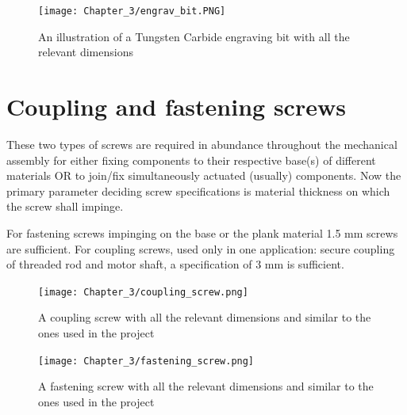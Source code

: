 \begin{figure}[h]
 \centering
 \texttt{[image: Chapter\_3/engrav\_bit.PNG]}
 \caption{An illustration of a Tungsten Carbide engraving bit with all the relevant dimensions}
 \label{fig:ebit}
\end{figure}

\section{Coupling and fastening screws} \label{screws}
These two types of screws are required in abundance throughout the mechanical assembly for either fixing components to their respective base(s) of different materials OR to join/fix simultaneously actuated (usually) components. Now the primary parameter deciding screw specifications is material thickness on which the screw shall impinge. \par

For fastening screws impinging on the base or the plank material 1.5 mm screws are sufficient. For coupling screws, used only in one application: secure coupling of threaded rod and motor shaft, a specification of 3 mm is sufficient.

\begin{figure}[h]
 \centering
 \texttt{[image: Chapter\_3/coupling\_screw.png]}
 \caption{A coupling screw with all the relevant dimensions and similar to the ones used in the project}
 \label{fig:cscrew}
\end{figure}

\begin{figure}[h]
 \centering
 \texttt{[image: Chapter\_3/fastening\_screw.png]}
 \caption{A fastening screw with all the relevant dimensions and similar to the ones used in the project}
 \label{fig:fscrew}
\end{figure}
